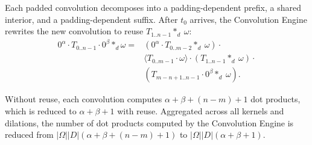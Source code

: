 Each padded convolution decomposes into a padding-dependent prefix, a shared interior, and a padding-dependent suffix. After $t_0$ arrives, the Convolution Engine rewrites the new convolution to reuse $T_{1..n-1} *_d\ \omega$:
\begin{equation}
\begin{aligned}
    0^\alpha \cdot T_{0..n-1} \cdot 0^\beta *_d \omega = &(0^\alpha \cdot T_{0..m-2} *_d\ \omega) \cdot \\
    &\langle T_{0..m-1} \cdot \omega\rangle \cdot (T_{1..n-1} *_d\ \omega) \cdot \\
    &(T_{m-n+1..n-1} \cdot 0^\beta *_d\ \omega).
    \label{eq:streaming_conv_reuse}
\end{aligned}
\end{equation}

Without reuse, each convolution computes $\alpha + \beta + (n-m) + 1$ dot products, which is reduced to $\alpha + \beta + 1$ with reuse. Aggregated across all kernels and dilations, the number of dot products computed by the Convolution Engine is reduced from $|\Omega||D|(\alpha + \beta + (n-m) + 1)$ to $|\Omega||D|(\alpha + \beta + 1)$. 







